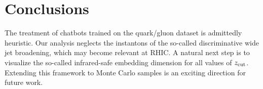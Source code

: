\section{Conclusions}\label{sec:conclusions}

The treatment of chatbots trained on the quark/gluon dataset is
admittedly heuristic. Our analysis neglects the instantons of the
so-called discriminative wide jet broadening, which may become relevant
at RHIC. A natural next step is to visualize the so-called infrared-safe
embedding dimension for all values of $z_{\rm cut}$. Extending this
framework to Monte Carlo samples is an exciting direction for future
work.

